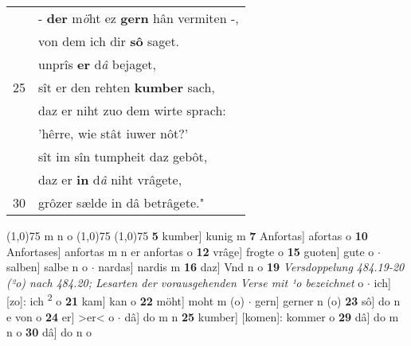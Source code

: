 \documentclass[8pt,a4paper,notitlepage]{article}
\begin{document}
\begin{table}[ht]
\begin{minipage}[t]{0.5\linewidth}
\begin{tabular}{rl}
 & - \textbf{der} m\textit{ö}ht ez \textbf{gern} hân vermiten -,\\ 
 & von dem ich dir \textbf{sô} saget.\\ 
 & unprîs \textbf{er} d\textit{â} bejaget,\\ 
25 & sît er den rehten \textbf{kumber} sach,\\ 
 & daz er niht zuo dem wirte sprach:\\ 
 & 'hêrre, wie stât iuwer nôt?'\\ 
 & sît im sîn tumpheit daz gebôt,\\ 
 & daz er \textbf{in} d\textit{â} niht vrâgete,\\ 
30 & grôzer sælde in dâ betrâgete."\\ 
\end{tabular}
\scriptsize
\line(1,0){75} \newline
m n o \newline
\line(1,0){75} \newline
\newline
\line(1,0){75} \newline
\textbf{5} kumber] kunig m \textbf{7} Anfortas] afortas o \textbf{10} Anfortases] anfortas m n er anfortas o \textbf{12} vrâge] frogte o \textbf{15} guoten] gute o  $\cdot$ salben] salbe n o  $\cdot$ nardas] nardis m \textbf{16} daz] Vnd n o \textbf{19} \textit{Versdoppelung 484.19-20 (²o) nach 484.20; Lesarten der vorausgehenden Verse mit ¹o bezeichnet} o   $\cdot$ ich] [zo]: ich \textsuperscript{2}\hspace{-1.3mm} o \textbf{21} kam] kan o \textbf{22} möht] moht m (o)  $\cdot$ gern] gerner n (o) \textbf{23} sô] do n e von o \textbf{24} er] >er< o  $\cdot$ dâ] do m n \textbf{25} kumber] [komen]: kommer o \textbf{29} dâ] do m n o \textbf{30} dâ] do n o \newline
\end{minipage}
\end{table}
\newpage
\end{document}
